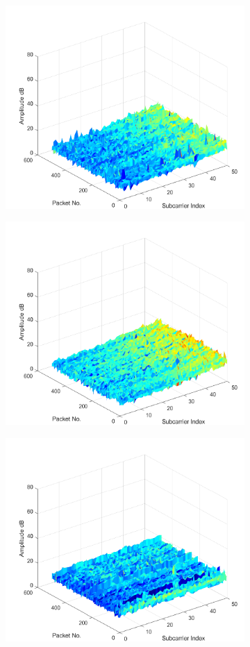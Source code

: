 \documentclass[binding=0.6cm,noexaminfo]{sapthesis}
\begin{document}
\begin{figure}[h!]
\centering
\begin{subfigure}{.49\textwidth}
	\centering
	\includegraphics[width=.8\linewidth]{ce-v2-1}
	\caption{}
\end{subfigure}
\begin{subfigure}{.49\textwidth}
	\centering
	\includegraphics[width=.8\linewidth]{ce-v2-3}
	\caption{}
\end{subfigure}
\begin{subfigure}{.49\textwidth}
	\centering
	\includegraphics[width=.8\linewidth]{room2-v7-6}

\end{subfigure}
\end{figure}
\end{document}
